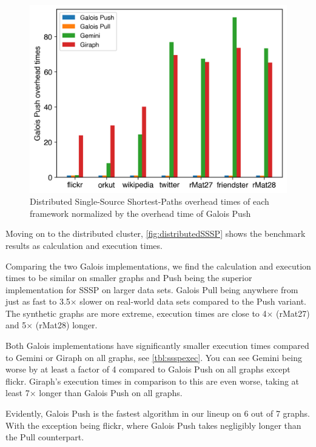 \begin{figure}
	\centering
	\includegraphics[width=\linewidth]{../../plots/distributedSSSP_overheadTimeNormalizedToGalois.png}
	\caption{Distributed Single-Source Shortest-Paths overhead times of each framework normalized by the overhead time of Galois Push}
	\label{fig:distributedSSSP_overhead}
\end{figure}

Moving on to the distributed cluster, \autoref{fig:distributedSSSP} shows the benchmark results as calculation and execution times. 

Comparing the two Galois implementations, we find the calculation and execution times to be similar on smaller graphs and Push being the superior implementation for SSSP on larger data sets. Galois Pull being anywhere from just as fast to 3.5$\times$ slower on real-world data sets compared to the Push variant. The synthetic graphs are more extreme, execution times are close to 4$\times$ (rMat27) and 5$\times$ (rMat28) longer.

Both Galois implementations have significantly smaller execution times compared to Gemini or Giraph on all graphs, see \autoref{tbl:ssspexec}.
You can see Gemini being worse by at least a factor of 4 compared to Galois Push on all graphs except flickr.
Giraph's execution times in comparison to this are even worse, taking at least 7$\times$ longer than Galois Push on all graphs.

Evidently, Galois Push is the fastest algorithm in our lineup on 6 out of 7 graphs. With the exception being flickr, where Galois Push takes negligibly longer than the Pull counterpart. 



